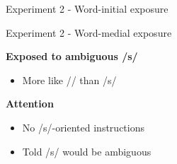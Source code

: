 \documentclass{beamer}
\begin{document}
\begin{frame}{Experiment 2 - Word-initial exposure}
\end{frame}

\begin{frame}{Experiment 2 - Word-medial exposure}

\begin{minipage}{0.45\textwidth}
\textbf{Exposed to ambiguous /s/}
\begin{itemize}
\item More like /\textesh/ than /s/
\end{itemize}

\textbf{Attention}
\begin{itemize}
\item No /s/-oriented instructions
\item Told /s/ would be ambiguous
\end{itemize}


\end{minipage}
\end{frame}
\end{document}
